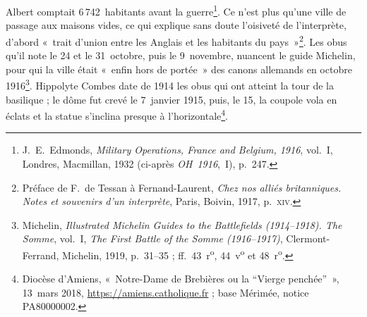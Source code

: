 Albert comptait 6\,742~habitants avant la guerre\footnote{J.~E.~Edmonds, \textit{Military Operations, France and Belgium, 1916}, vol.~I, Londres, Macmillan, 1932 (ci-après \textit{OH~1916},~I), p.~247.}. Ce n'est plus qu'une ville de passage aux maisons vides, ce qui explique sans doute l'oisiveté de l'interprète, d'abord «~trait d'union entre les Anglais et les habitants du pays~»\footnote{Préface de F.~de Tessan à Fernand-Laurent, \textit{Chez nos alliés britanniques. Notes et souvenirs d'un interprète}, Paris, Boivin, 1917, p.~\textsc{xiv}.}. Les obus qu'il note le 24 et le 31~octobre, puis le 9~novembre, nuancent le guide Michelin, pour qui la ville était «~enfin hors de portée~» des canons allemands en octobre 1916\footnote{Michelin, \textit{Illustrated Michelin Guides to the Battlefields (1914--1918). The Somme}, vol.~I, \textit{The First Battle of the Somme (1916--1917)}, Clermont-Ferrand, Michelin, 1919, p.~31--35 ; ff.~43~r\textsuperscript{o}, 44~v\textsuperscript{o} et 48~r\textsuperscript{o}.}. Hippolyte Combes date de 1914 les obus qui ont atteint la tour de la basilique ; le dôme fut crevé le 7~janvier 1915, puis, le 15, la coupole vola en éclats et la statue s'inclina presque à l'horizontale\footnote{Diocèse d'Amiens, «~Notre-Dame de Brebières ou la “Vierge penchée”~», 13~mars 2018, \url{https://amiens.catholique.fr} ; base Mérimée, notice PA80000002.}.

